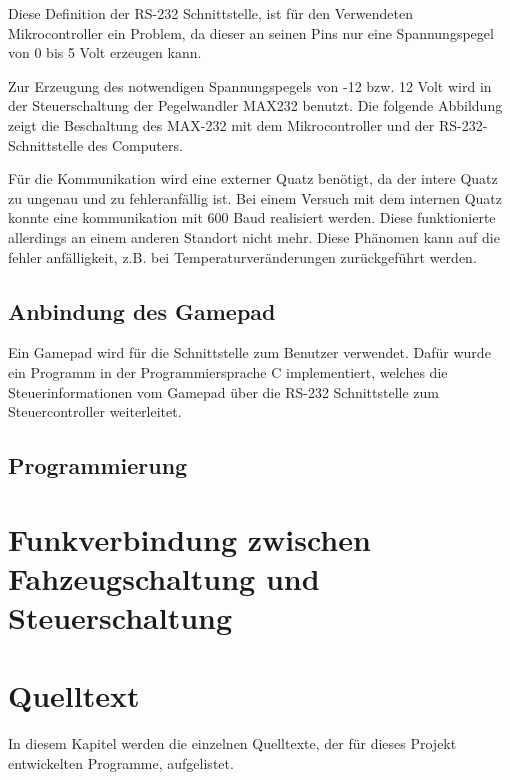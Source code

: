 \documentclass{scrartcl}
\begin{document}
		Diese Definition der RS-232 Schnittstelle, ist für den Verwendeten Mikrocontroller ein Problem,
		da dieser an seinen Pins nur eine Spannungspegel von 0 bis 5 Volt erzeugen kann.

		Zur Erzeugung des notwendigen Spannungspegels von -12 bzw. 12 Volt wird in der Steuerschaltung der Pegelwandler MAX232 benutzt.
		Die folgende Abbildung zeigt die Beschaltung des MAX-232 mit dem Mikrocontroller und der RS-232-Schnittstelle des Computers.

		Für die Kommunikation wird eine externer Quatz benötigt, da der intere Quatz zu ungenau und zu fehleranfällig ist.
		Bei einem Versuch mit dem internen Quatz konnte eine kommunikation mit 600 Baud realisiert werden.
		Diese funktionierte allerdings an einem anderen Standort nicht mehr. Diese Phänomen kann auf die fehler anfälligkeit,
		z.B. bei Temperaturveränderungen zurückgeführt werden.

	\subsection{Anbindung des Gamepad} %
		Ein Gamepad wird für die Schnittstelle zum Benutzer verwendet.
		Dafür wurde ein Programm in der Programmiersprache C implementiert,
		welches die Steuerinformationen vom Gamepad über die RS-232 Schnittstelle zum Steuercontroller weiterleitet.
	
	\subsection{Programmierung} %

\section{Funkverbindung zwischen Fahzeugschaltung und Steuerschaltung} %

\newpage

\section{Quelltext} %
	In diesem Kapitel werden die einzelnen Quelltexte, der für dieses Projekt entwickelten Programme, aufgelistet.



\end{document}
